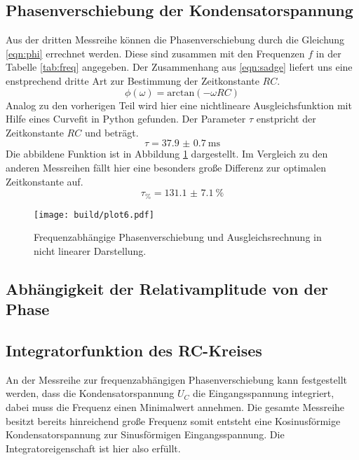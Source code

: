 \subsection{Phasenverschiebung der Kondensatorspannung}
Aus der dritten Messreihe können die Phasenverschiebung durch die Gleichung \eqref{eqn:phi} errechnet werden. Diese sind zusammen
mit den Frequenzen $f$ in der Tabelle \ref{tab:freq} angegeben.
Der Zusammenhang aus \eqref{eqn:sadge} liefert uns eine enstprechend dritte Art zur Bestimmung der Zeitkonstante $RC$.
\begin{equation}
    \phi(\omega) = \text{arctan}(-\omega RC)
\end{equation}
Analog zu den vorherigen Teil wird hier eine nichtlineare Ausgleichsfunktion mit Hilfe eines Curvefit in Python gefunden.
Der Parameter $\tau$ enstpricht der Zeitkonstante $RC$ und beträgt.
\begin{equation}
    \tau = \SI{37.9(07)}{\ms}
\end{equation}
Die abbildene Funktion ist in Abbildung \ref{fig:plttausend} dargestellt. Im Vergleich zu den anderen Messreihen fällt hier eine besonders
große Differenz zur optimalen Zeitkonstante auf.
\begin{equation*}
    \label{eqn:Mp1kompletterMuell}
    \tau_{\si{\percent}} = \SI{131.1(71)}{\percent}
\end{equation*}
\begin{figure}
    \centering 
    \texttt{[image: build/plot6.pdf]}
    \caption{Frequenzabhängige Phasenverschiebung und Ausgleichsrechnung in nicht linearer Darstellung.}
    \label{fig:plttausend}
\end{figure} 

\subsection{Abhängigkeit der Relativamplitude von der Phase}

\subsection{Integratorfunktion des RC-Kreises}
An der Messreihe zur frequenzabhängigen Phasenverschiebung kann festgestellt werden, dass die Kondensatorspannung $U_{C}$ die Eingangsspannung
integriert, dabei muss die Frequenz einen Minimalwert annehmen. Die gesamte Messreihe besitzt bereits hinreichend große Frequenz somit entsteht eine Kosinusförmige Kondensatorspannung
zur Sinusförmigen Eingangsspannung. Die Integratoreigenschaft ist hier also erfüllt.

